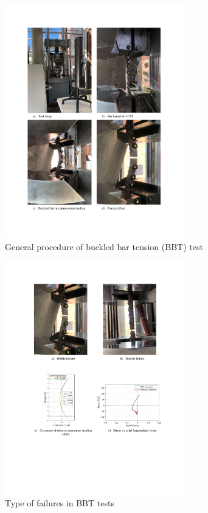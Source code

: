 \begin{figure}[htbp]
	\centering
	\includegraphics[width=0.7\textwidth]{VAC Thesis 2.0/Chapter-4/figs/BBT Procedure.pdf}
	\caption{General procedure of buckled bar tension (BBT) test}
	\label{fig:BBT_Test_Summary}
\end{figure}

\begin{figure}[htbp]
	\centering
    \includegraphics[width=0.7\textwidth]{VAC Thesis 2.0/Chapter-4/figs/BBT_Brittle_vs_Ductile_fracture.pdf}
	\caption{Type of failures in BBT tests}
	\label{fig:bbt_brittle_vs_duc}
\end{figure}


